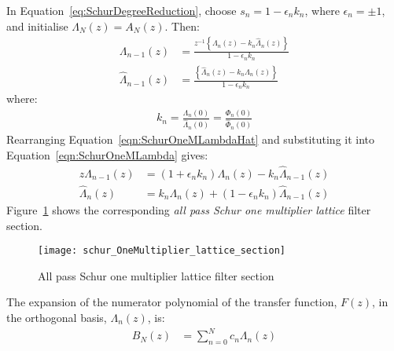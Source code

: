 \documentclass[a4paper,twoside,10pt,english]{article}
\begin{document}
In Equation~\ref{eq:SchurDegreeReduction}, choose $s_{n}=1-\epsilon_{n}k_{n}$,
where $\epsilon_{n}=\pm 1$, and initialise $\Lambda_{N}\left(z\right)=A_{N}\left(z\right)$. Then:
\begin{subequations}
\begin{align}
  \Lambda_{n-1}\left(z\right) &= \frac{z^{-1}\left\{\Lambda_{n}\left(z\right)-
                             k_{n}\hat{\Lambda}_{n}\left(z\right)\right\}}
                                {1-\epsilon_{n}k_{n}}
  \label{eqn:SchurOneMLambda} \\
  \hat{\Lambda}_{n-1}\left(z\right)
                              &= \frac{\left\{\hat{\Lambda}_{n}\left(z\right)-
                                       k_{n}\Lambda_{n}\left(z\right)\right\}}
                                      {1-\epsilon_{n}k_{n}}
  \label{eqn:SchurOneMLambdaHat}
\end{align}
\end{subequations}
where:
\begin{align*}
  k_{n}=\frac{\Lambda_{n}\left(0\right)}{\hat{\Lambda}_{n}\left(0\right)}
  =\frac{\Phi_{n}\left(0\right)}{\hat{\Phi}_{n}\left(0\right)}
\end{align*}
Rearranging Equation~\ref{eqn:SchurOneMLambdaHat} and substituting it into
Equation~\ref{eqn:SchurOneMLambda} gives:
\begin{align*}
  z\Lambda_{n-1}\left(z\right)
  &=\left(1+\epsilon_{n}k_{n}\right)\Lambda_{n}\left(z\right)-
    k_{n}\hat{\Lambda}_{n-1}\left(z\right)\\
  \hat{\Lambda}_{n}\left(z\right) & = k_{n}\Lambda_{n}\left(z\right)+
              \left(1-\epsilon_{n}k_{n}\right)\hat{\Lambda}_{n-1}\left(z\right)
\end{align*}
Figure~\ref{fig:Schur-one-multiplier-lattice-section} shows the corresponding
\emph{all pass Schur one multiplier lattice} filter section.

\begin{figure}[!ht]
\centering
\texttt{[image: schur\_OneMultiplier\_lattice\_section]}
\caption{All pass Schur one multiplier lattice filter section}
\label{fig:Schur-one-multiplier-lattice-section}
\end{figure}

The expansion of the numerator polynomial of the transfer function,
$F\left(z\right)$, in the orthogonal basis, $\Lambda_{n}\left(z\right)$, is:
\begin{align*}
B_{N}\left(z\right) & = \sum_{n=0}^{N}c_{n}\Lambda_{n}\left(z\right)
\end{align*}
\end{document}
